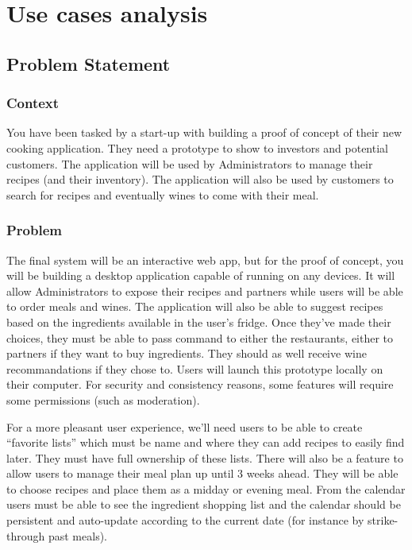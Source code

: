 \documentclass[english,12pt,twoside,a4paper]{report}
\begin{document}
\setlength{\columnsep}{1cm}
\tableofcontents
\clearpage

\hypersetup{linkcolor=red}

\vfill
\part{Use cases analysis}
\vfill
\clearpage
\chapter{Problem Statement}
\section{Context}
You have been tasked by a start-up with building a proof of concept of their new cooking application. They need a prototype to show to investors and potential customers. The application will be used by Administrators to manage their recipes (and their inventory). The application will also be used by customers to search for recipes and eventually wines to come with their meal.
\section{Problem}
The final system will be an interactive web app, but for the proof of concept, you will be building a desktop application capable of running on any devices. It will allow Administrators to expose their recipes and partners while users will be able to order meals and wines. The application will also be able to suggest recipes based on the ingredients available in the user's fridge. Once they’ve made their choices, they must be able to pass command to either the restaurants, either to partners if they want to buy ingredients. They should as well receive wine recommandations if they chose to. Users will launch this prototype locally on their computer. For security and consistency reasons, some features will require some permissions (such as moderation).

For a more pleasant user experience, we’ll need users to be able to create “favorite lists” which must be name and where they can add recipes to easily find later. They must have full ownership of these lists. There will also be a feature to allow users to manage their meal plan up until 3 weeks ahead. They will be able to choose recipes and place them as a midday or evening meal. From the calendar users must be able to see the ingredient shopping list and the calendar should be persistent and auto-update according to the current date (for instance by strike-through past meals).
\end{document}
